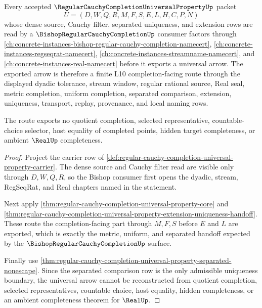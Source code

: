 \begin{theorem}
\label{thm:regular-cauchy-completion-universal-property-bishop-handoff}
Every accepted $\RegularCauchyCompletionUniversalPropertyUp$ packet
$$
U=(D,W,Q,R,M,F,S,E,L,H,C,P,N)
$$
whose dense source, Cauchy filter, separated uniqueness, and extension rows are read by a $\BishopRegularCauchyCompletionUp$ consumer factors through \autoref{ch:concrete-instances-bishop-regular-cauchy-completion-namecert}, \autoref{ch:concrete-instances-regseqrat-namecert}, \autoref{ch:concrete-instances-streamname-namecert}, and \autoref{ch:concrete-instances-real-namecert} before it exports a universal arrow. The exported arrow is therefore a finite L10 completion-facing route through the displayed dyadic tolerance, stream window, regular rational source, Real seal, metric completion, uniform completion, separated comparison, extension, uniqueness, transport, replay, provenance, and local naming rows.

The route exports no quotient completion, selected representative, countable-choice selector, host equality of completed points, hidden target completeness, or ambient $\RealUp$ completeness.
\end{theorem}
\begin{proof}
Project the carrier row of \autoref{def:regular-cauchy-completion-universal-property-carrier}. The dense source and Cauchy filter read are visible only through $D,W,Q,R$, so the Bishop consumer first opens the dyadic, stream, RegSeqRat, and Real chapters named in the statement.

Next apply \autoref{thm:regular-cauchy-completion-universal-property-core} and \autoref{thm:regular-cauchy-completion-universal-property-extension-uniqueness-handoff}. These route the completion-facing part through $M,F,S$ before $E$ and $L$ are exported, which is exactly the metric, uniform, and separated handoff expected by the $\BishopRegularCauchyCompletionUp$ surface.

Finally use \autoref{thm:regular-cauchy-completion-universal-property-separated-nonescape}. Since the separated comparison row is the only admissible uniqueness boundary, the universal arrow cannot be reconstructed from quotient completion, selected representatives, countable choice, host equality, hidden completeness, or an ambient completeness theorem for $\RealUp$.
\end{proof}


